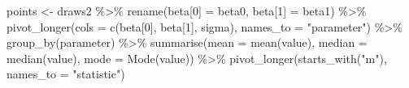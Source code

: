 \documentclass[
  letterpaper,
  DIV=11,
  numbers=noendperiod]{scrartcl}
\newenvironment{Shaded}{\begin{snugshade}}{\end{snugshade}}
\newcommand{\AttributeTok}[1]{\textcolor[rgb]{0.40,0.45,0.13}{#1}}
\newcommand{\FunctionTok}[1]{\textcolor[rgb]{0.28,0.35,0.67}{#1}}
\newcommand{\NormalTok}[1]{\textcolor[rgb]{0.00,0.23,0.31}{#1}}
\newcommand{\OtherTok}[1]{\textcolor[rgb]{0.00,0.23,0.31}{#1}}
\newcommand{\SpecialCharTok}[1]{\textcolor[rgb]{0.37,0.37,0.37}{#1}}
\newcommand{\StringTok}[1]{\textcolor[rgb]{0.13,0.47,0.30}{#1}}
\begin{document}
\begin{Shaded}
\begin{Highlighting}[]
\NormalTok{points }\OtherTok{\textless{}{-}}\NormalTok{ draws2 }\SpecialCharTok{\%\textgreater{}\%} 
  \FunctionTok{rename}\NormalTok{(}\StringTok{\textasciigrave{}}\AttributeTok{beta[0]}\StringTok{\textasciigrave{}} \OtherTok{=}\NormalTok{ beta0,}
         \StringTok{\textasciigrave{}}\AttributeTok{beta[1]}\StringTok{\textasciigrave{}} \OtherTok{=}\NormalTok{ beta1) }\SpecialCharTok{\%\textgreater{}\%} 
  \FunctionTok{pivot\_longer}\NormalTok{(}\AttributeTok{cols =} \FunctionTok{c}\NormalTok{(}\StringTok{\textasciigrave{}}\AttributeTok{beta[0]}\StringTok{\textasciigrave{}}\NormalTok{, }\StringTok{\textasciigrave{}}\AttributeTok{beta[1]}\StringTok{\textasciigrave{}}\NormalTok{, sigma), }
               \AttributeTok{names\_to =} \StringTok{"parameter"}\NormalTok{) }\SpecialCharTok{\%\textgreater{}\%} 
  \FunctionTok{group\_by}\NormalTok{(parameter) }\SpecialCharTok{\%\textgreater{}\%} 
  \FunctionTok{summarise}\NormalTok{(}\AttributeTok{mean =} \FunctionTok{mean}\NormalTok{(value),}
            \AttributeTok{median =} \FunctionTok{median}\NormalTok{(value),}
            \AttributeTok{mode =} \FunctionTok{Mode}\NormalTok{(value)) }\SpecialCharTok{\%\textgreater{}\%} 
  \FunctionTok{pivot\_longer}\NormalTok{(}\FunctionTok{starts\_with}\NormalTok{(}\StringTok{"m"}\NormalTok{), }\AttributeTok{names\_to =} \StringTok{"statistic"}\NormalTok{)}



\end{Highlighting}
\end{Shaded}
\end{document}

